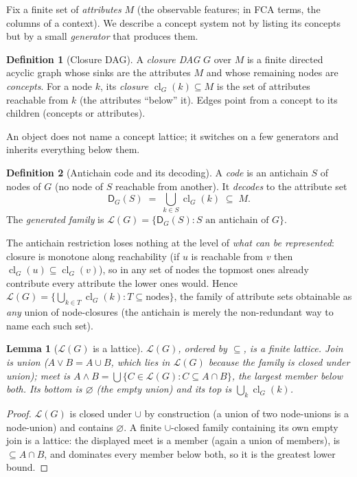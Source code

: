 \documentclass[11pt]{article}
\theoremstyle{definition}
\newtheorem{definition}{Definition}
\theoremstyle{plain}
\newtheorem{lemma}{Lemma}
\theoremstyle{remark}
\newcommand{\cl}{\operatorname{cl}}       %
\newcommand{\Dcode}{\mathsf{D}}            %
\newcommand{\Lgen}{\mathcal{L}}            %
\newcommand{\attrs}{M}
\begin{document}
Fix a finite set of \emph{attributes} $\attrs$ (the observable features; in FCA
terms, the columns of a context). We describe a concept system not by listing its
concepts but by a small \emph{generator} that produces them.

\begin{definition}[Closure DAG]
A \emph{closure DAG} $G$ over $\attrs$ is a finite directed acyclic graph whose
sinks are the attributes $\attrs$ and whose remaining nodes are \emph{concepts}.
For a node $k$, its \emph{closure} $\cl_G(k)\subseteq\attrs$ is the set of
attributes reachable from $k$ (the attributes ``below'' it). Edges point from a
concept to its children (concepts or attributes).
\end{definition}

An object does not name a concept lattice; it switches on a few generators and
inherits everything below them.

\begin{definition}[Antichain code and its decoding]
A \emph{code} is an antichain $S$ of nodes of $G$ (no node of $S$ reachable from
another). It \emph{decodes} to the attribute set
\[
  \Dcode_G(S)\;=\;\bigcup_{k\in S}\cl_G(k)\;\subseteq\;\attrs .
\]
The \emph{generated family} is $\Lgen(G)=\{\Dcode_G(S): S \text{ an antichain of } G\}$.
\end{definition}

The antichain restriction loses nothing at the level of \emph{what can be
represented}: closure is monotone along reachability (if $u$ is reachable from
$v$ then $\cl_G(u)\subseteq\cl_G(v)$), so in any set of nodes the topmost ones
already contribute every attribute the lower ones would. Hence
$\Lgen(G)=\bigl\{\bigcup_{k\in T}\cl_G(k): T\subseteq \text{nodes}\bigr\}$, the
family of attribute sets obtainable as \emph{any} union of node-closures
(the antichain is merely the non-redundant way to name each such set).

\begin{lemma}[$\Lgen(G)$ is a lattice]
\label{lem:lattice}
$\Lgen(G)$, ordered by $\subseteq$, is a finite lattice. Join is union
($A\vee B=A\cup B$, which lies in $\Lgen(G)$ because the family is closed under
union); meet is $A\wedge B=\bigcup\{C\in\Lgen(G):C\subseteq A\cap B\}$, the
largest member below both. Its bottom is $\varnothing$ (the empty union) and its
top is $\bigcup_k \cl_G(k)$.
\end{lemma}

\begin{proof}
$\Lgen(G)$ is closed under $\cup$ by construction (a union of two node-unions is a
node-union) and contains $\varnothing$. A finite $\cup$-closed family containing
its own empty join is a lattice: the displayed meet is a member (again a union of
members), is $\subseteq A\cap B$, and dominates every member below both, so it is
the greatest lower bound.
\end{proof}
\end{document}
